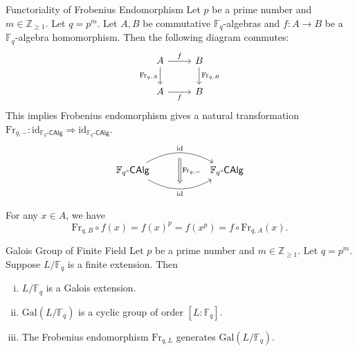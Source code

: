 \begin{proposition}{Functoriality of Frobenius Endomorphism}{}
    Let $p$ be a prime number and $m\in\mathbb{Z}_{\ge1}$. Let $q=p^m$. Let $A,B$ be commutative $\mathbb{F}_q$-algebras and $f:A\to B$ be a $\mathbb{F}_q$-algebra homomorphism. Then the following diagram commutes:
    \[
        \begin{tikzcd}
            A \arrow[d, "{\mathrm{Fr}_{q,A}}"'] \arrow[r, "f"] & B \arrow[d, "{\mathrm{Fr}_{q,B}}"] \\
            A \arrow[r, "f"']                                  & B                                 
            \end{tikzcd}
    \]
    This implies Frobenius endomorphism gives a natural transformation $\mathrm{Fr}_{q,-}:\mathrm{id}_{\mathbb{F}_q\text{-}\mathsf{CAlg}}\Rightarrow \mathrm{id}_{\mathbb{F}_q\text{-}\mathsf{CAlg}}$.
    \[
        \begin{tikzcd}[ampersand replacement=\&]
            \mathbb{F}_q\text{-}\mathsf{CAlg}\arrow[r, "\mathrm{id}"{name=A, above}, bend left] \arrow[r, "\mathrm{id}"'{name=B, below}, bend right] \&[+30pt] \mathbb{F}_q\text{-}\mathsf{CAlg}
            \arrow[Rightarrow, shorten <=5.5pt, shorten >=5.5pt, from=A.south-|B, to=B, "\mathrm{Fr}_{q,-}"]
        \end{tikzcd}
    \]
    
\end{proposition}
\begin{prf}
    For any $x\in A$, we have
    \[
    \mathrm{Fr}_{q,B}\circ f(x)=f(x)^p=f(x^p)=f\circ \mathrm{Fr}_{q,A}(x).
    \]
    \end{prf}


\begin{proposition}{Galois Group of Finite Field}{}
    Let $p$ be a prime number and $m\in\mathbb{Z}_{\ge1}$. Let $q=p^m$. Suppose $L/\mathbb{F}_q$ is a finite extension. Then
    \begin{enumerate}[(i)]
        \item $L/\mathbb{F}_q$ is a Galois extension.
        \item $\mathrm{Gal}(L/\mathbb{F}_q)$ is a cyclic group of order $[L:\mathbb{F}_q]$.
        \item The Frobenius endomorphism $\mathrm{Fr}_{q,L}$ generates $\mathrm{Gal}(L/\mathbb{F}_q)$.
    \end{enumerate}
\end{proposition}